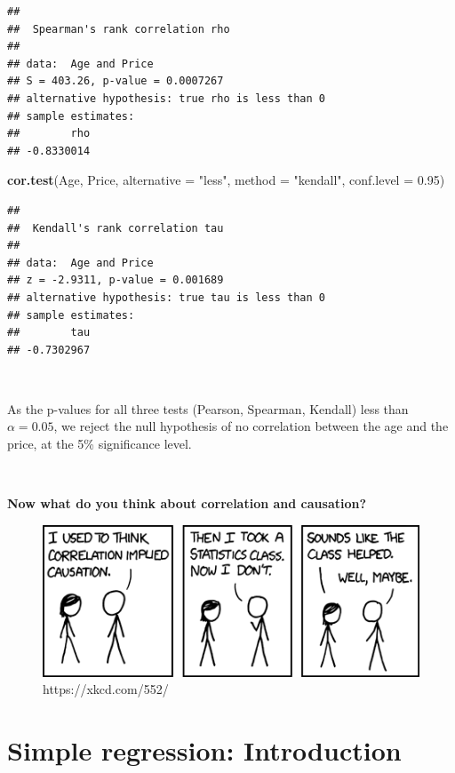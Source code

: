 \documentclass[
]{article}
\newenvironment{Shaded}{\begin{snugshade}}{\end{snugshade}}
\newcommand{\AttributeTok}[1]{\textcolor[rgb]{0.13,0.29,0.53}{#1}}
\newcommand{\FloatTok}[1]{\textcolor[rgb]{0.00,0.00,0.81}{#1}}
\newcommand{\FunctionTok}[1]{\textcolor[rgb]{0.13,0.29,0.53}{\textbf{#1}}}
\newcommand{\NormalTok}[1]{#1}
\newcommand{\StringTok}[1]{\textcolor[rgb]{0.31,0.60,0.02}{#1}}
\begin{document}
\begin{verbatim}
## 
##  Spearman's rank correlation rho
## 
## data:  Age and Price
## S = 403.26, p-value = 0.0007267
## alternative hypothesis: true rho is less than 0
## sample estimates:
##        rho 
## -0.8330014
\end{verbatim}

\begin{Shaded}
\begin{Highlighting}[]
\FunctionTok{cor.test}\NormalTok{(Age, Price,}
         \AttributeTok{alternative =} \StringTok{"less"}\NormalTok{,}
         \AttributeTok{method =} \StringTok{"kendall"}\NormalTok{, }\AttributeTok{conf.level =} \FloatTok{0.95}\NormalTok{)}
\end{Highlighting}
\end{Shaded}

\begin{verbatim}
## 
##  Kendall's rank correlation tau
## 
## data:  Age and Price
## z = -2.9311, p-value = 0.001689
## alternative hypothesis: true tau is less than 0
## sample estimates:
##        tau 
## -0.7302967
\end{verbatim}

\(~\)

As the p-values for all three tests (Pearson, Spearman, Kendall) less
than \(\alpha=0.05\), we reject the null hypothesis of no correlation
between the age and the price, at the 5\% significance level.

\(~\)

\textbf{Now what do you think about correlation and causation?}

\begin{figure}

{\centering \includegraphics[width=0.6\linewidth,height=0.6\textheight]{figures/correlationxkcd} 

}

\caption{https://xkcd.com/552/}\label{fig:unnamed-chunk-31}
\end{figure}

\hypertarget{simple-regression-introduction-1}{%
\section{Simple regression:
Introduction}\label{simple-regression-introduction-1}}
\end{document}
